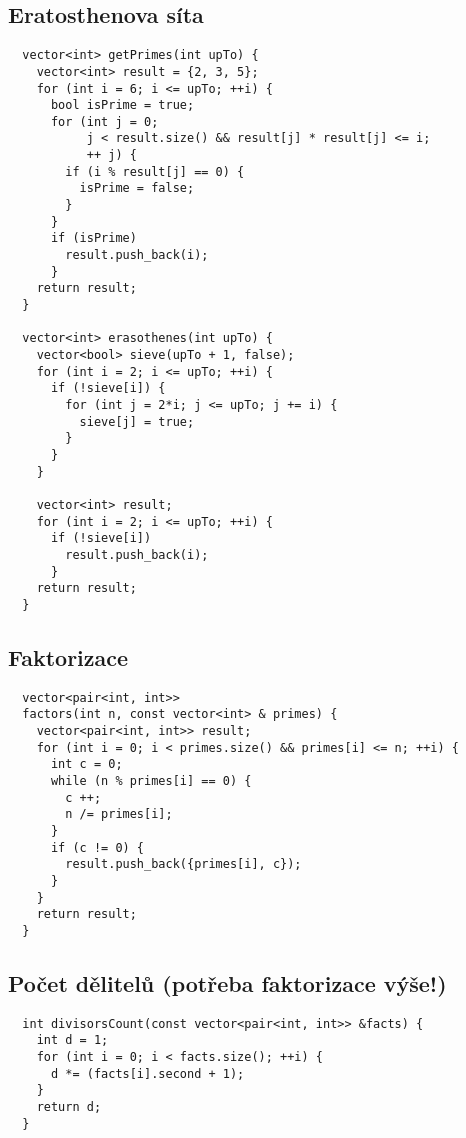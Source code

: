 \documentclass{article}
\begin{document}
\subsection{Eratosthenova síta}
\begin{lstlisting}
  vector<int> getPrimes(int upTo) {
    vector<int> result = {2, 3, 5};
    for (int i = 6; i <= upTo; ++i) {
      bool isPrime = true;
      for (int j = 0; 
           j < result.size() && result[j] * result[j] <= i; 
           ++ j) {
        if (i % result[j] == 0) {
          isPrime = false;
        }
      }
      if (isPrime)
        result.push_back(i);
      }
    return result;
  }

  vector<int> erasothenes(int upTo) {
    vector<bool> sieve(upTo + 1, false);
    for (int i = 2; i <= upTo; ++i) {
      if (!sieve[i]) {
        for (int j = 2*i; j <= upTo; j += i) {
          sieve[j] = true;
        }
      }
    }

    vector<int> result;
    for (int i = 2; i <= upTo; ++i) {
      if (!sieve[i])
        result.push_back(i);
      }
    return result;
  }
\end{lstlisting}

\subsection{Faktorizace}
\begin{lstlisting}
  vector<pair<int, int>> 
  factors(int n, const vector<int> & primes) {
    vector<pair<int, int>> result;
    for (int i = 0; i < primes.size() && primes[i] <= n; ++i) {
      int c = 0;
      while (n % primes[i] == 0) {
        c ++;
        n /= primes[i];
      }
      if (c != 0) {
        result.push_back({primes[i], c});
      }
    }
    return result;
  }
\end{lstlisting}

\subsection{Počet dělitelů (potřeba faktorizace výše!)}
\begin{lstlisting}
  int divisorsCount(const vector<pair<int, int>> &facts) {
    int d = 1;
    for (int i = 0; i < facts.size(); ++i) {
      d *= (facts[i].second + 1);
    }
    return d;
  }
\end{lstlisting}
\end{document}
